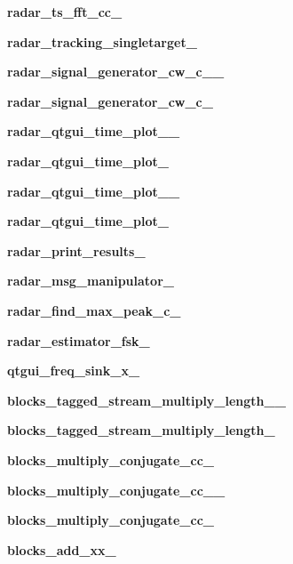 \begin{DoxyCompactItemize}
{\bf radar\+\_\+ts\+\_\+fft\+\_\+cc\+\_}
\item 
{\bf radar\+\_\+tracking\+\_\+singletarget\+\_}
\item 
{\bf radar\+\_\+signal\+\_\+generator\+\_\+cw\+\_\+c\+\_\+\_}
\item 
{\bf radar\+\_\+signal\+\_\+generator\+\_\+cw\+\_\+c\+\_}
\item 
{\bf radar\+\_\+qtgui\+\_\+time\+\_\+plot\+\_\+\_}
\item 
{\bf radar\+\_\+qtgui\+\_\+time\+\_\+plot\+\_}
\item 
{\bf radar\+\_\+qtgui\+\_\+time\+\_\+plot\+\_\+\_}
\item 
{\bf radar\+\_\+qtgui\+\_\+time\+\_\+plot\+\_}
\item 
{\bf radar\+\_\+print\+\_\+results\+\_}
\item 
{\bf radar\+\_\+msg\+\_\+manipulator\+\_}
\item 
{\bf radar\+\_\+find\+\_\+max\+\_\+peak\+\_\+c\+\_}
\item 
{\bf radar\+\_\+estimator\+\_\+fsk\+\_}
\item 
{\bf qtgui\+\_\+freq\+\_\+sink\+\_\+x\+\_}
\item 
{\bf blocks\+\_\+tagged\+\_\+stream\+\_\+multiply\+\_\+length\+\_\+\_}
\item 
{\bf blocks\+\_\+tagged\+\_\+stream\+\_\+multiply\+\_\+length\+\_}
\item 
{\bf blocks\+\_\+multiply\+\_\+conjugate\+\_\+cc\+\_}
\item 
{\bf blocks\+\_\+multiply\+\_\+conjugate\+\_\+cc\+\_\+\_}
\item 
{\bf blocks\+\_\+multiply\+\_\+conjugate\+\_\+cc\+\_}
\item 
{\bf blocks\+\_\+add\+\_\+xx\+\_}
\end{DoxyCompactItemize}
